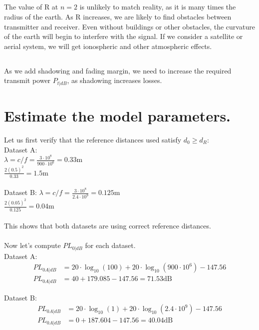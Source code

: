 \documentclass[]{article}
\begin{document}
\subsection{}
The value of R at $n=2$ is unlikely to match reality, as it is many times the radius of the earth. As R increases, we are likely to find obstacles between transmitter and receiver. Even without buildings or other obstacles, the curvature of the earth will begin to interfere with the signal. If we consider a satellite or aerial system, we will get ionospheric and other atmospheric effects.

\subsection{}
As we add shadowing and fading margin, we need to increase the required transmit power $P_{t|dB}$, as shadowing increases losses.

\section{Estimate the model parameters.}
Let us first verify that the reference distances used satisfy $d_0 \geq d_R$:\\
Dataset A:\\
$\lambda = c/f = \frac{3\cdot 10 ^8}{900\cdot 10^6} = 0.33$m\\
$\frac{2(0.5)^2}{0.33} = 1.5$m\\\\
Dataset B:
$\lambda = c/f = \frac{3\cdot 10 ^8}{2.4\cdot 10^9} = 0.125$m\\
$\frac{2(0.05)^2}{0.125} = 0.04$m\\\\

This shows that both datasets are using correct reference distances.\\\\

Now let's compute $PL_{0|dB}$ for each dataset.\\
Dataset A:\\
\begin{align*}
	PL_{0A|dB} &= 20 \cdot \log_{10}(100) + 20 \cdot \log_{10}(900 \cdot 10^6) - 147.56\\
	PL_{0A|dB} &= 40 + 179.085 - 147.56 = 71.53\text{dB}
\end{align*}

Dataset B:\\
\begin{align*}
	PL_{0A|dB} &= 20 \cdot \log_{10}(1) + 20 \cdot \log_{10}(2.4 \cdot 10^9) - 147.56\\
	PL_{0A|dB} &= 0 + 187.604 - 147.56 = 40.04\text{dB}
\end{align*}
\end{document}
